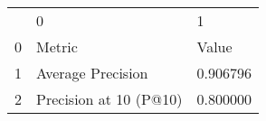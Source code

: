 \begin{tabular}{lll}
 & 0 & 1 \\
0 & Metric & Value \\
1 & Average Precision & 0.906796 \\
2 & Precision at 10 (P@10) & 0.800000 \\
\end{tabular}
